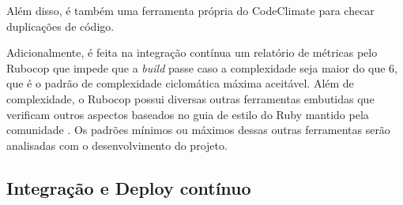 Além disso, é também uma ferramenta própria do CodeClimate para checar duplicações de código.

Adicionalmente, é feita na integração contínua um relatório de métricas pelo Rubocop que impede que a \textit{build} passe caso a complexidade seja maior do que 6, que é o padrão de complexidade ciclomática máxima aceitável. Além de complexidade, o Rubocop possui diversas outras ferramentas embutidas que verificam outros aspectos baseados no guia de estilo do Ruby mantido pela comunidade \cite{rubocop}. Os padrões mínimos ou máximos dessas outras ferramentas serão analisadas com o desenvolvimento do projeto.

\subsection{Integração e Deploy contínuo}

